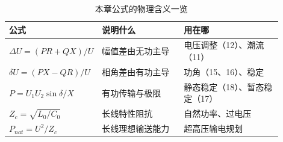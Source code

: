 \begin{table}[htbp]
  \centering
  \caption{本章公式的物理含义一览}
  \small
  \begin{tabular}{@{}p{0.24\linewidth}p{0.30\linewidth}p{0.36\linewidth}@{}}
    \toprule
    公式 & 说明什么 & 用在哪 \\
    \midrule
    $\Delta U=(PR+QX)/U$ & 幅值差由无功主导 & 电压调整（12）、潮流（11） \\
    $\delta U=(PX-QR)/U$ & 相角差由有功主导 & 功角（15、16）、稳定 \\
    $P=U_1U_2\sin\delta/X$ & 有功传输与极限 & 静态稳定（18）、暂态稳定（17） \\
    $Z_c=\sqrt{L_0/C_0}$ & 长线特性阻抗 & 自然功率、过电压 \\
    $P_{nat}=U^{2}/Z_c$ & 长线理想输送能力 & 超高压输电规划 \\
    \bottomrule
  \end{tabular}
\end{table}

